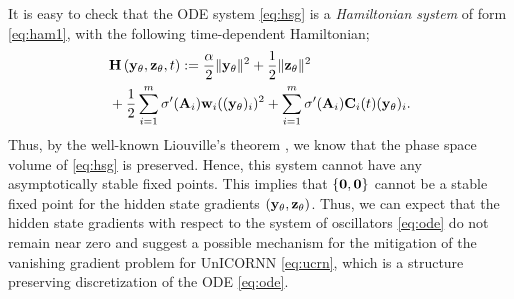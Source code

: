 \documentclass{article}
\newcommand{\by}{{\bf y}}
\newcommand{\bz}{{\bf z}}
\newcommand{\bw}{{\bf w}}
\newcommand{\bA}{{\bf A}}
\newcommand{\bC}{{\bf C}}
\begin{document}
It is easy to check that the ODE system \eqref{eq:hsg} is a \emph{Hamiltonian system} of form \eqref{eq:ham1}, with the following time-dependent Hamiltonian;
\begin{equation}
    \label{eq:hsgHam}
    \begin{aligned}
    &{\bf H}\left(\by_{\theta},\bz_{\theta},t\right):= \frac{\alpha}{2}\|\by_{\theta}\|^2 + \frac{1}{2}\|\bz_{\theta}\|^2
    \\&+ \frac{1}{2}\sum\limits_{i=1}^m \sigma^{\prime}(\bA_i)\bw_i ((\by_{\theta})_i)^2 
    + \sum\limits_{i=1}^m \sigma^{\prime}(\bA_i) \bC_i(t)(\by_{\theta})_i.
    \end{aligned}
    \end{equation}
Thus, by the well-known Liouville's theorem \cite{ss1}, we know that the phase space volume of \eqref{eq:hsg} is preserved. Hence, this system cannot have any asymptotically stable fixed points. This implies that $\left\{\bf 0, \bf 0\right\}$ cannot be a stable fixed point for the hidden state gradients $\left(\by_{\theta},\bz_{\theta}\right)$. Thus, we can expect that the hidden state gradients with respect to the system of oscillators \eqref{eq:ode} do not remain near zero and suggest a possible mechanism for the mitigation of the vanishing gradient problem for UnICORNN \eqref{eq:ucrn}, which is a structure preserving discretization of the ODE \eqref{eq:ode}.
\end{document}
